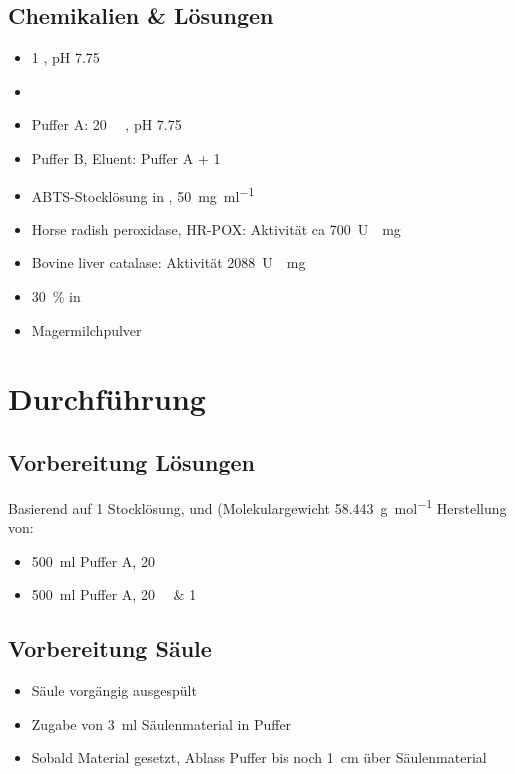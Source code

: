 \documentclass[a4paper,german]{scrreprt}
\begin{document}
\section{Chemikalien \& Lösungen}

\begin{itemize}
	\item  \SI{1}{\Molar} , pH 7.75
	\item {}
	\item Puffer A: \SI{20}{\milli\Molar} , pH 7.75
	\item Puffer B, Eluent: Puffer A + \SI{1}{\Molar} 
	\item ABTS-Stocklösung in , \SI{50}{\milli\gram \per \milli\litre}
	\item Horse radish peroxidase, HR-POX: Aktivität ca \SI{700}{U \per \milli\gram}
	\item Bovine liver catalase: Aktivität \SI{2088}{U \per \milli\gram}
	\item {} \SI{30}{\percent} in 
	\item Magermilchpulver
\end{itemize}

\chapter{Durchführung}

\section{Vorbereitung Lösungen}

Basierend auf \SI{1}{\Molar}  Stocklösung, und 
(Molekulargewicht \SI{58.443}{\gram\per mol} Herstellung von:
\begin{itemize}
	\item \SI{500}{ml} Puffer A, \SI{20}{\milli\Molar} 
	\item \SI{500}{ml} Puffer A, \SI{20}{\milli\Molar}  \& \SI{1}{\Molar} 
\end{itemize}

\section{Vorbereitung Säule}

\begin{itemize}
	\item Säule vorgängig ausgespült
	\item Zugabe von \SI{3}{ml} Säulenmaterial in Puffer
	\item Sobald Material gesetzt, Ablass Puffer bis noch \SI{1}{cm} über Säulenmaterial
\end{itemize}
\end{document}
